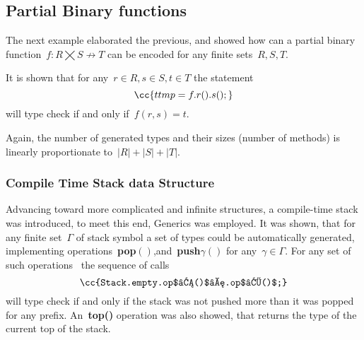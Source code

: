 \subsection*{Partial Binary functions}
The next example elaborated the previous, and showed
  how can a partial binary function~$f:R⨉S↛T$
  can be encoded for any finite sets~$R,S,T$.

It is shown that for any~$r∈R , s∈S , t∈T$
  the statement
\[
  \cc{t tmp = f.r().s();}
\]
  will type check if and only if~$f(r,s)=t$.

Again, the number of generated types and their sizes (number of methods)
  is linearly proportionate to~$|R|+|S|+|T|$.

\subsubsection*{Compile Time Stack data Structure}
Advancing toward more complicated and infinite structures,
  a compile-time stack was introduced, to meet this end,
  \Java Generics was employed.
It was shown, that for any finite set~$Γ$ of stack symbol
  a set of \Java types could be automatically generated,
  implementing operations~\textbf{pop$()$},and~\textbf{push$γ()$}
  for any~$γ∈Γ$.
For any set of such operations~ the sequence of calls\[
  \cc{Stack.empty.op$₁()$….op$ₖ()$;}
\]
will type check if and only if the stack was not pushed more
  than it was popped for any prefix.
An~\textbf{top()} operation was also showed, that returns the type
  of the current top of the stack.
